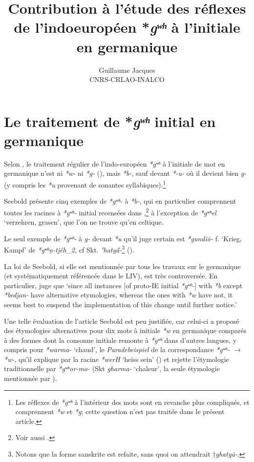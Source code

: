 \documentclass[11pt]{article}
\newcommand{\ipa}[1]{{\phon\textit{#1}}}
\begin{document}
 
\title{Contribution à l'étude des réflexes de l'indoeuropéen *\ipa{gʷʰ} à l'initiale en germanique}
\author{Guillaume Jacques\\ CNRS-CRLAO-INALCO}
\maketitle

\sloppy

\section{Le traitement de *\ipa{gʷʰ} initial en germanique}
Selon \citet{seebold67ghw}, le traitement régulier de l'indo-européen \ipa{*gʷʰ} à l'initiale de mot en germanique n'est ni \ipa{*w-} ni \ipa{*g-} (\citealt[122-3]{streitberg1900urgermanische}), mais \ipa{*b-}, sauf devant \ipa{*-u-} où il devient bien \ipa{g-} (y compris les \ipa{*u} provenant de sonantes syllabiques).\footnote{Les réflexes de \ipa{*gʷʰ} à l'intérieur des mots sont en revanche plus compliqués, et comprennent \ipa{*w} et \ipa{*g}; cette question n'est pas traitée dans le présent article. }

Seebold présente cinq exemples de \ipa{*gʷʰ-} à \ipa{*b-}, qui en particulier comprennent toutes les racines à \ipa{*gʷʰ-} initial recensées dans \citet{liv},\footnote{Voir aussi \citet[note 46]{garnier16dybo}.} à l'exception de \ipa{*gʷʰel} `verzehren, grasen', que l'on ne trouve qu'en celtique.

Le seul exemple de \ipa{*gʷʰ-} à \ipa{g-} devant \ipa{*u} qu'il juge certain est \ipa{*gundiō-} f. `Krieg, Kampf' de \ipa{*gʷʰṇ-tjéh_2}, cf Skt. \ipa{°hatyā́-}\footnote{Notons que la forme sanskrite est refaite, sans quoi on attendrait $\dagger$\ipa{ghatyā-}.} (\citealt[105]{seebold67ghw}).

La loi de Seebold, si elle est mentionnée par tous les travaux sur le germanique (et systématiquement référencée dans le LIV), est très controversée. En particulier, \citet[xxviii]{kroonen13dict} juge que `since all instances [of proto-IE initial \ipa{*gʷʰ-}] with \ipa{*b} except \ipa{*bedjan-} have alternative etymologies, whereas the ones with \ipa{*w} have not, it seems best to suspend the implementation of this change until further notice.'

Une telle évaluation de l'article Seebold est peu justifiée, car celui-ci a proposé des étymologies alternatives pour dix mots à initiale \ipa{*w} en germanique comparés à des formes dont la consonne initiale remonte à \ipa{*gʷʰ} dans d'autres langues, y compris pour \ipa{*warma-} `chaud', le \textit{Paradebeispiel} de la correspondance \ipa{*gʷʰ-} $\rightarrow$ \ipa{*w-}, qu'il explique par la racine \ipa{*werH} `heiss sein' (\citealt[689]{liv}) et rejette l'étymologie traditionnelle par \ipa{*gʷʰor-mo-} (Skt \ipa{gharma-} `chaleur', la seule étymologie mentionnée par \citealt[575]{kroonen13dict}).
\end{document}
